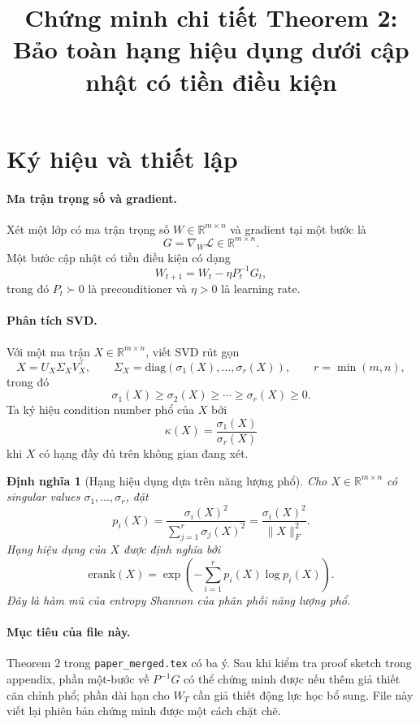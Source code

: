 \documentclass[11pt,a4paper]{article}
\title{Chứng minh chi tiết Theorem 2: \\ Bảo toàn hạng hiệu dụng dưới cập nhật có tiền điều kiện}
\author{}
\date{}
\newtheorem{definition}{Định nghĩa}
\newcommand{\erank}{\mathrm{erank}}
\newcommand{\RR}{\mathbb{R}}
\newcommand{\cL}{\mathcal{L}}
\newcommand{\diag}{\mathrm{diag}}
\begin{document}
\maketitle

\section{Ký hiệu và thiết lập}

\paragraph{Ma trận trọng số và gradient.}
Xét một lớp có ma trận trọng số $W \in \RR^{m \times n}$ và gradient tại một bước là
\[
G = \nabla_W \cL \in \RR^{m \times n}.
\]
Một bước cập nhật có tiền điều kiện có dạng
\[
W_{t+1} = W_t - \eta P_t^{-1}G_t,
\]
trong đó $P_t \succ 0$ là preconditioner và $\eta > 0$ là learning rate.

\paragraph{Phân tích SVD.}
Với một ma trận $X \in \RR^{m \times n}$, viết SVD rút gọn
\[
X = U_X \Sigma_X V_X^\top,
\qquad
\Sigma_X = \diag(\sigma_1(X), \ldots, \sigma_r(X)),
\qquad
r = \min(m,n),
\]
trong đó
\[
\sigma_1(X) \geq \sigma_2(X) \geq \cdots \geq \sigma_r(X) \geq 0.
\]
Ta ký hiệu condition number phổ của $X$ bởi
\[
\kappa(X) = \frac{\sigma_1(X)}{\sigma_r(X)}
\]
khi $X$ có hạng đầy đủ trên không gian đang xét.

\begin{definition}[Hạng hiệu dụng dựa trên năng lượng phổ]
\label{def:erank}
Cho $X \in \RR^{m \times n}$ có singular values $\sigma_1,\dots,\sigma_r$, đặt
\[
p_i(X) = \frac{\sigma_i(X)^2}{\sum_{j=1}^r \sigma_j(X)^2} = \frac{\sigma_i(X)^2}{\|X\|_F^2}.
\]
Hạng hiệu dụng của $X$ được định nghĩa bởi
\[
\erank(X) = \exp\!\left(-\sum_{i=1}^{r} p_i(X) \log p_i(X)\right).
\]
Đây là hàm mũ của entropy Shannon của phân phối năng lượng phổ.
\end{definition}

\paragraph{Mục tiêu của file này.}
Theorem 2 trong \texttt{paper\_merged.tex} có ba ý. Sau khi kiểm tra proof sketch trong appendix, phần một-bước về $P^{-1}G$ có thể chứng minh được nếu thêm giả thiết căn chỉnh phổ; phần dài hạn cho $W_T$ cần giả thiết động lực học bổ sung. File này viết lại phiên bản chứng minh được một cách chặt chẽ.
\end{document}
